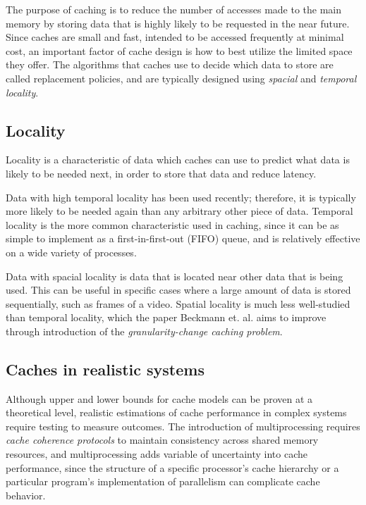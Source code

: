 \documentclass[12pt,twoside]{reedthesis}
\begin{document}
The purpose of caching is to reduce the number of accesses made to the main memory by storing data that is highly likely to be requested in the near future. Since caches are small and fast, intended to be accessed frequently at minimal cost, an important factor of cache design is how to best utilize the limited space they offer. The algorithms that caches use to decide which data to store are called replacement policies, and are typically designed using \textit{spacial} and \textit{temporal locality}.

	\subsection*{Locality}

	Locality is a characteristic of data which caches can use to predict what data is likely to be needed next, in order to store that data and reduce latency.
	
	Data with high temporal locality has been used recently; therefore, it is typically more likely to be needed again than any arbitrary other piece of data. Temporal locality is the more common characteristic used in caching, since it can be as simple to implement as a first-in-first-out (FIFO) queue, and is relatively effective on a wide variety of processes.
	
	Data with spacial locality is data that is located near other data that is being used. This can be useful in specific cases where a large amount of data is stored sequentially, such as frames of a video. Spatial locality is much less well-studied than temporal locality, which the paper Beckmann et. al. aims to improve through introduction of the \textit{granularity-change caching problem}.

	\subsection*{Caches in realistic systems}

	Although upper and lower bounds for cache models can be proven at a theoretical level, realistic estimations of cache performance in complex systems require testing to measure outcomes. The introduction of multiprocessing requires \textit{cache coherence protocols} to maintain consistency across shared memory resources, and multiprocessing adds variable of uncertainty into cache performance, since the structure of a specific processor's cache hierarchy or a particular program's implementation of parallelism can complicate cache behavior.
\end{document}
